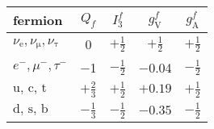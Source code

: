 \begin{tabular}{lcccc}
	\toprule
	fermion & $Q_f$ & $I_3^f$ & $g_\mathrm{V}^f$ & $g_\mathrm{A}^f$ \\
	\midrule
	$\nu_\mathrm{e}, \nu_\mathrm{\mu}, \nu_\mathrm{\tau}$ & \num{0} & $+\frac{1}{2}$ & $+\frac{1}{2}$& $+\frac{1}{2}$\\[7pt]
	$e^-, \mu^-, \tau^-$ & \num{-1} & $-\frac{1}{2}$ & \num{-0.04} & $-\frac{1}{2}$ \\[7pt]
	$\text{u, c, t}$ & $+\frac{2}{3}$ & $+\frac{1}{2}$ & $+\num{0.19}$ & $+\frac{1}{2}$ \\[7pt]
	$\text{d, s, b}$ & $-\frac{1}{3}$ & $-\frac{1}{2}$ & $\num{-0.35}$ & $-\frac{1}{2}$ \\
	\bottomrule
\end{tabular}